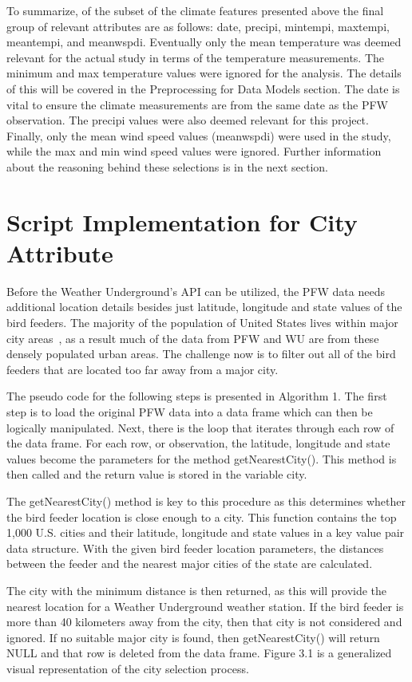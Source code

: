 To summarize, of the subset of the climate features presented above the final group of relevant attributes are as follows: date, precipi, mintempi, maxtempi, meantempi, and meanwspdi. Eventually only the mean temperature was deemed relevant for the actual study in terms of the temperature measurements. The minimum and max temperature values were ignored for the analysis. The details of this will be covered in the Preprocessing for Data Models section. The date is vital to ensure the climate measurements are from the same date as the PFW observation. The precipi values were also deemed relevant for this project. Finally, only the mean wind speed values (meanwspdi) were used in the study, while the max and min wind speed values were ignored. Further information about the reasoning behind these selections is in the next section.


\section{Script Implementation for City Attribute}

Before the Weather Underground's API can be utilized, the PFW data needs additional location details besides just latitude, longitude and state values of the bird feeders. The majority of the population of United States lives within major city areas~\cite{sutton1997comparison}, as a result much of the data from PFW and WU are from these densely populated urban areas. The challenge now is to filter out all of the bird feeders that are located too far away from a major city.

The pseudo code for the following steps is presented in Algorithm 1. The first step is to load the original PFW data into a data frame which can then be logically manipulated. Next, there is the loop that iterates through each row of the data frame. For each row, or observation, the latitude, longitude and state values become the parameters for the method getNearestCity(). This method is then called and the return value is stored in the variable city.

The getNearestCity() method is key to this procedure as this determines whether the bird feeder location is close enough to a city. This function contains the top 1,000 U.S. cities and their latitude, longitude and state values in a key value pair data structure. With the given bird feeder location parameters, the distances between the feeder and the nearest major cities of the state are calculated. 

The city with the minimum distance is then returned, as this will provide the nearest location for a Weather Underground weather station. If the bird feeder is more than 40 kilometers away from the city, then that city is not considered and ignored. If no suitable major city is found, then getNearestCity() will return NULL and that row is deleted from the data frame. Figure 3.1 is a generalized visual representation of the city selection process. 


